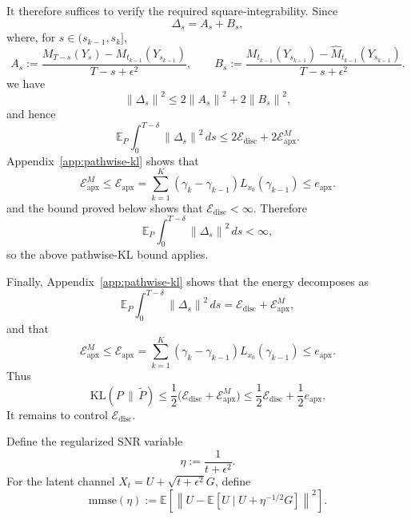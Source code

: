 \documentclass[11pt]{article}
\newtheorem{lemma}{Lemma}
\newcommand{\E}{\mathbb{E}}
\newcommand{\KL}{\mathrm{KL}}
\newcommand{\mmse}{\mathrm{mmse}}
\newcommand{\eps}{\epsilon}
\newcommand{\norm}[1]{\left\lVert #1 \right\rVert}
\begin{document}
It therefore suffices to verify the required square-integrability. Since
\[
    \Delta_s=A_s+B_s,
\]
where, for $s\in(s_{k-1},s_k]$,
\[
    A_s:=
    \frac{
    M_{T-s}(Y_s)-M_{t_{k-1}}(Y_{s_{k-1}})
    }{
    T-s+\eps^2
    },
    \qquad
    B_s:=
    \frac{
    M_{t_{k-1}}(Y_{s_{k-1}})
    -
    \widehat M_{t_{k-1}}(Y_{s_{k-1}})
    }{
    T-s+\eps^2
    } .
\]
we have
\[
    \norm{\Delta_s}^2\le 2\norm{A_s}^2+2\norm{B_s}^2,
\]
and hence
\[
    \E_P\int_0^{T-\delta}\norm{\Delta_s}^2\,ds
    \le
    2\mathcal E_{\mathrm{disc}}+2\mathcal E_{\mathrm{apx}}^{M}.
\]
Appendix~\ref{app:pathwise-kl} shows that
\[
    \mathcal E_{\mathrm{apx}}^{M}
    \le
    \mathcal E_{\mathrm{apx}}
    =
    \sum_{k=1}^K
    (\gamma_k-\gamma_{k-1})L_{x_0}(\gamma_{k-1})
    \le e_{\mathrm{apx}}.
\]
and the bound proved below shows that \(\mathcal E_{\mathrm{disc}}<\infty\).
Therefore
\[
    \E_P\int_0^{T-\delta}\norm{\Delta_s}^2\,ds<\infty,
\]
so the above pathwise-KL bound applies.

Finally, Appendix~\ref{app:pathwise-kl} shows that the energy decomposes as
\[
    \E_P\int_0^{T-\delta}\norm{\Delta_s}^2\,ds
    =
    \mathcal E_{\mathrm{disc}}+\mathcal E_{\mathrm{apx}}^{M},
\]
and that
\[
    \mathcal E_{\mathrm{apx}}^{M}
    \le
    \mathcal E_{\mathrm{apx}}
    =
    \sum_{k=1}^K
    (\gamma_k-\gamma_{k-1})L_{x_0}(\gamma_{k-1})
    \le e_{\mathrm{apx}}.
\]
Thus
\[
    \KL(P\,\|\,\widetilde P)
    \le
    \frac12
    \bigl(\mathcal E_{\mathrm{disc}}+\mathcal E_{\mathrm{apx}}^{M}\bigr)
    \le
    \frac12\mathcal E_{\mathrm{disc}}+\frac12 e_{\mathrm{apx}}.
\]
It remains to control \(\mathcal E_{\mathrm{disc}}\).


Define the regularized SNR variable
\[
    \eta:=\frac1{t+\eps^2}.
\]
For the latent channel $X_t=U+\sqrt{t+\eps^2}G$, define
\[
    \mmse(\eta)
    :=
    \E\left[
    \norm{
    U-\E[U\mid U+\eta^{-1/2}G]
    }^2
    \right].
\]



\end{document}
